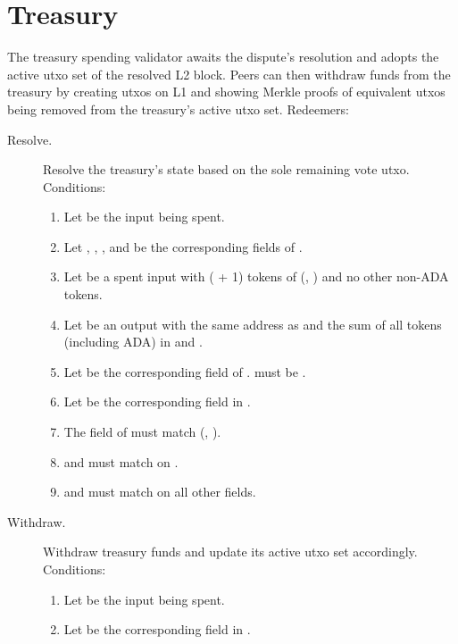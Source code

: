 \documentclass[../hydrozoa.tex]{subfiles}
\begin{document}
\section{Treasury}%
\label{h:l1-rule-based-treasury}%

The treasury spending validator awaits the dispute's resolution and adopts the active utxo set of the resolved L2 block.
Peers can then withdraw funds from the treasury by creating utxos on L1 and showing Merkle proofs of equivalent utxos being removed from the treasury's active utxo set.
Redeemers:
\begin{description}
  \item[Resolve.] Resolve the treasury's state based on the sole remaining vote utxo.
    Conditions:
    \begin{enumerate}
      \item Let  be the input being spent.
      \item Let , , , and  be the corresponding fields of .
      \item Let  be a spent input with ( + 1) tokens of (, ) and no other non-ADA tokens.
      \item Let  be an output with the same address as  and the sum of all tokens (including ADA) in  and .
      \item Let  be the corresponding field of .  must be .
      \item Let  be the corresponding field in .
      \item The  field of  must match (, ).
      \item {} and  must match on .
      \item {} and  must match on all other fields.
    \end{enumerate}
  \item[Withdraw.] Withdraw treasury funds and update its active utxo set accordingly.
    Conditions:
    \begin{enumerate}
      \item Let  be the input being spent.
      \item Let  be the corresponding field in .

\end{enumerate}
\end{description}
\end{document}
